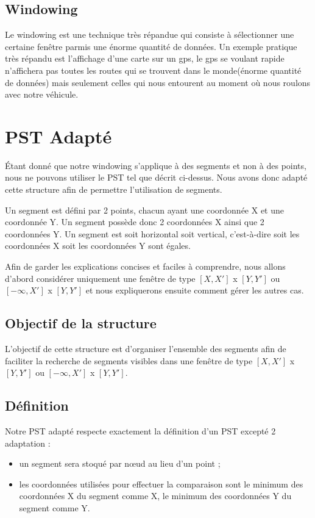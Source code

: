 \documentclass[10pt,a4paper]{article}
\begin{document}

\subsection{Windowing}
Le windowing est une technique très répandue qui consiste à sélectionner une certaine fenêtre parmis une énorme quantité de données. Un exemple pratique très répandu est l'affichage d'une carte sur un gps, le gps se voulant rapide n'affichera pas toutes les routes qui se trouvent dans le monde(énorme quantité de données) mais seulement celles qui nous entourent au moment où  nous roulons avec notre véhicule.


\newpage
\section{PST Adapté}
Étant donné que notre windowing s'applique à des segments et non à des points, nous ne pouvons utiliser le PST tel que décrit ci-dessus. Nous avons donc adapté cette structure afin de permettre l'utilisation de segments.

Un segment est défini par 2 points, chacun ayant une coordonnée X et une coordonnée Y. Un segment possède donc 2 coordonnées X ainsi que 2 coordonnées Y. Un segment est soit horizontal soit vertical, c'est-à-dire soit les coordonnées X soit les coordonnées Y sont égales.

Afin de garder les explications concises et faciles à comprendre, nous allons d'abord considérer uniquement une fenêtre de type $[X, X']$ x $[Y, Y']$ ou $[-\infty, X']$ x $[Y, Y']$ et nous expliquerons ensuite comment gérer les autres cas.

\subsection{Objectif de la structure}
L'objectif de cette structure est d'organiser l'ensemble des segments afin de faciliter la recherche de segments visibles dans une fenêtre de type $[X, X']$ x $[Y, Y']$ ou $[-\infty, X']$ x $[Y, Y']$.

\subsection{Définition}
Notre PST adapté respecte exactement la définition d'un PST excepté 2 adaptation :
\begin{itemize}
	\item un segment sera stoqué par nœud au lieu d'un point ;
	\item les coordonnées utilisées pour effectuer la comparaison sont le minimum des coordonnées X du segment comme X, le minimum des coordonnées Y du segment comme Y.
\end{itemize}
\end{document}

